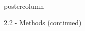 \documentclass{beamer}
\begin{document}
\begin{frame}
\begin{columns}
\begin{column}{.499\textwidth}
\begin{beamercolorbox}[center]{postercolumn}
\begin{minipage}{.98\textwidth}
{\begin{myblock}{2.2 - Methods (continued)}

							

\end{myblock}}
\end{minipage}
\end{beamercolorbox}
\end{column}
\end{columns}
\end{frame}
\end{document}

